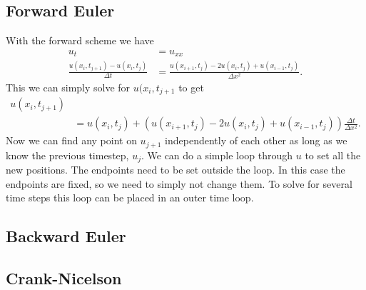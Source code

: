 \subsection{Forward Euler}

With the forward scheme we have
\begin{align*}
    u_t &= u_{xx} \\
    \frac{u(x_i, t_{j+1}) - u(x_i, t_j)}{\Delta t}
    &= \frac{u(x_{i+1}, t_j) - 2u(x_i, t_j) + u(x_{i-1}, t_j)}{\Delta x^2}.
\end{align*}
This we can simply solve for $u(x_i, t_{j+1}$ to get
\begin{align*}
    u(x_i, t_{j+1}) \\
    &= u(x_i, t_j)
    +  \left( u(x_{i+1}, t_j) - 2u(x_i, t_j) + u(x_{i-1}, t_j) \right)
       \frac{\Delta t}{\Delta x^2}.
\end{align*}
Now we can find any point on $u_{j+1}$ independently of each other
as long as we know the previous timestep, $u_j$. We can do a simple
loop through $u$ to set all the new positions. The endpoints need
to be set outside the loop. In this case the endpoints are fixed,
so we need to simply not change them. To solve for several time
steps this loop can be placed in an outer time loop.


\subsection{Backward Euler}


\subsection{Crank-Nicelson}
